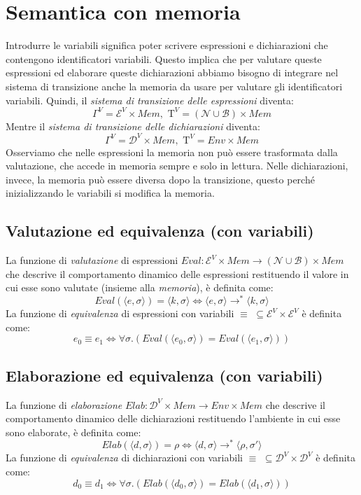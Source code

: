 \documentclass[a4paper,oneside,titlepage]{book}
\begin{document}
\section{Semantica con memoria}
Introdurre le variabili significa poter scrivere espressioni e dichiarazioni che contengono identificatori variabili. Questo implica che per valutare queste espressioni ed elaborare queste dichiarazioni abbiamo bisogno di integrare nel sistema di transizione anche la memoria da usare per valutare gli identificatori variabili. Quindi, il \textit{sistema di transizione delle espressioni} diventa:
\[ \Gamma^V = \mathcal{E}^V \times Mem, \text{ T}^V = (\mathcal{N} \cup \mathcal{B}) \times Mem \]
Mentre il \textit{sistema di transizione delle dichiarazioni} diventa:
\[ \Gamma^V = \mathcal{D}^V \times Mem, \text{ T}^V = Env \times Mem \]
Osserviamo che nelle espressioni la memoria non può essere trasformata dalla valutazione, che accede in memoria sempre e solo in lettura. Nelle dichiarazioni, invece, la memoria può essere diversa dopo la transizione, questo perché inizializzando le variabili si modifica la memoria.

\subsection{Valutazione ed equivalenza (con variabili)}
La funzione di \textit{valutazione} di espressioni $Eval: \mathcal{E}^V \times Mem \rightarrow (\mathcal{N} \cup \mathcal{B}) \times Mem$ che descrive il comportamento dinamico delle espressioni restituendo il valore in cui esse sono valutate (insieme alla \textit{memoria}), è definita come:
\[ Eval(\langle e,\sigma \rangle) = \langle k,\sigma \rangle \iff \langle e,\sigma \rangle \to^* \langle k,\sigma \rangle \]
La funzione di \textit{equivalenza} di espressioni con variabili $\equiv$ $\subseteq \mathcal{E}^V \times \mathcal{E}^V$ è definita come:
\[ e_0 \equiv e_1 \iff \forall \sigma.(Eval(\langle e_0,\sigma \rangle) = Eval(\langle e_1,\sigma \rangle)) \]

\subsection{Elaborazione ed equivalenza (con variabili)}
La funzione di \textit{elaborazione} $Elab: \mathcal{D}^V \times Mem \to Env \times Mem$ che descrive il comportamento dinamico delle dichiarazioni restituendo l'ambiente in cui esse sono elaborate, è definita come:
\[ Elab(\langle d,\sigma \rangle)=\rho \iff \langle d,\sigma \rangle \rightarrow^* \langle \rho,\sigma' \rangle \]
La funzione di \textit{equivalenza} di dichiarazioni con variabili $\equiv$ $\subseteq \mathcal{D}^V \times \mathcal{D}^V$ è definita come:
\[ d_0 \equiv d_1 \iff \forall \sigma.(Elab(\langle d_0,\sigma \rangle) = Elab(\langle d_1,\sigma \rangle)) \]
\end{document}
